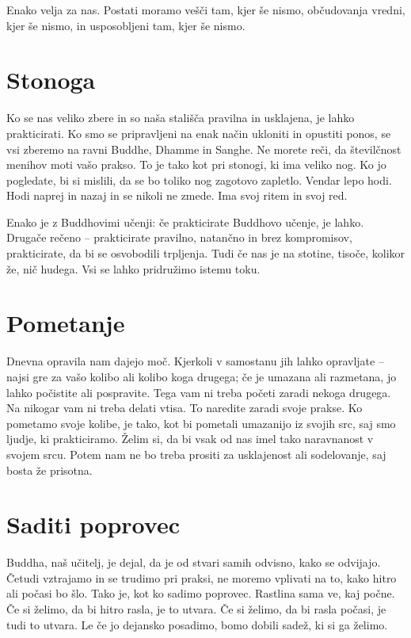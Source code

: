 Enako velja za nas. Postati moramo vešči tam, kjer še nismo, občudovanja vredni, kjer še nismo, in usposobljeni tam, kjer še nismo.

\section{Stonoga}

Ko se nas veliko zbere in so naša stališča pravilna in usklajena, je lahko prakticirati. Ko smo se pripravljeni na enak način ukloniti in opustiti ponos, se vsi zberemo na ravni Buddhe, Dhamme in Sanghe. Ne morete reči, da številčnost menihov moti vašo prakso. To je tako kot pri stonogi, ki ima veliko nog. Ko jo pogledate, bi si mislili, da se bo toliko nog zagotovo zapletlo. Vendar lepo hodi. Hodi naprej in nazaj in se nikoli ne zmede. Ima svoj ritem in svoj red.

Enako je z Buddhovimi učenji: če prakticirate Buddhovo učenje, je lahko. Drugače rečeno – prakticirate pravilno, natančno in brez kompromisov, prakticirate, da bi se osvobodili trpljenja. Tudi če nas je na stotine, tisoče, kolikor že, nič hudega. Vsi se lahko pridružimo istemu toku.

\section{Pometanje}

Dnevna opravila nam dajejo moč. Kjerkoli v samostanu jih lahko opravljate – najsi gre za vašo kolibo ali kolibo koga drugega; če je umazana ali razmetana, jo lahko počistite ali pospravite. Tega vam ni treba početi zaradi nekoga drugega. Na nikogar vam ni treba delati vtisa. To naredite zaradi svoje prakse. Ko pometamo svoje kolibe, je tako, kot bi pometali umazanijo iz svojih src, saj smo ljudje, ki prakticiramo. Želim si, da bi vsak od nas imel tako naravnanost v svojem srcu. Potem nam ne bo treba prositi za usklajenost ali sodelovanje, saj bosta že prisotna.

\section{Saditi poprovec}

Buddha, naš učitelj, je dejal, da je od stvari samih odvisno, kako se odvijajo. Četudi vztrajamo in se trudimo pri praksi, ne moremo vplivati na to, kako hitro ali počasi bo šlo. Tako je, kot ko sadimo poprovec. Rastlina sama ve, kaj počne. Če si želimo, da bi hitro rasla, je to utvara. Če si želimo, da bi rasla počasi, je tudi to utvara. Le če jo dejansko posadimo, bomo dobili sadež, ki si ga želimo.

